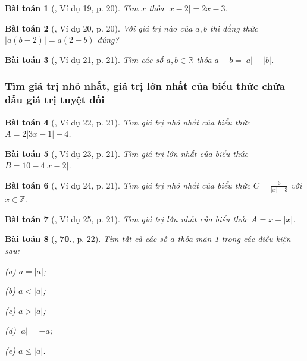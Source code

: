 \documentclass{article}
\numberwithin{equation}{section}
\newtheorem{baitoan}{Bài toán}
\begin{document}
\begin{baitoan}[\cite{Binh_Toan_7_tap_1}, Ví dụ 19, p. 20]
	Tìm $x$ thỏa $|x - 2| = 2x - 3$.
\end{baitoan}

\begin{baitoan}[\cite{Binh_Toan_7_tap_1}, Ví dụ 20, p. 20]
	Với giá trị nào của $a,b$ thì đẳng thức $|a(b - 2)| = a(2 - b)$ đúng?
\end{baitoan}

\begin{baitoan}[\cite{Binh_Toan_7_tap_1}, Ví dụ 21, p. 21]
	Tìm các số $a,b\in\mathbb{R}$ thỏa $a + b = |a| - |b|$.
\end{baitoan}

\subsubsection{Tìm giá trị nhỏ nhất, giá trị lớn nhất của biểu thức chứa dấu giá trị tuyệt đối}

\begin{baitoan}[\cite{Binh_Toan_7_tap_1}, Ví dụ 22, p. 21]
	Tìm giá trị nhỏ nhất của biểu thức $A = 2|3x - 1| - 4$.
\end{baitoan}

\begin{baitoan}[\cite{Binh_Toan_7_tap_1}, Ví dụ 23, p. 21]
	Tìm giá trị lớn nhất của biểu thức $B = 10 - 4|x - 2|$.
\end{baitoan}

\begin{baitoan}[\cite{Binh_Toan_7_tap_1}, Ví dụ 24, p. 21]
	Tìm giá trị nhỏ nhất của biểu thức $C = \frac{6}{|x| - 3}$ với $x\in\mathbb{Z}$.
\end{baitoan}

\begin{baitoan}[\cite{Binh_Toan_7_tap_1}, Ví dụ 25, p. 21]
	Tìm giá trị lớn nhất của biểu thức $A = x - |x|$.
\end{baitoan}

\begin{baitoan}[\cite{Binh_Toan_7_tap_1}, \textbf{70.}, p. 22]
	Tìm tất cả các số $a$ thỏa mãn 1 trong các điều kiện sau:
	\begin{enumerate*}
		\item[(a)] $a = |a|$;
		\item[(b)] $a < |a|$;
		\item[(c)] $a > |a|$;
		\item[(d)] $|a| = -a$;
		\item[(e)] $a\le|a|$.
	\end{enumerate*}
\end{baitoan}
\end{document}
